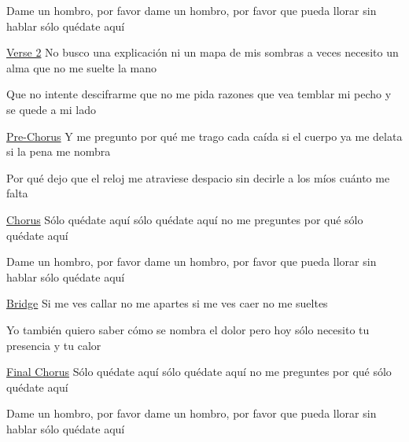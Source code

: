 Dame un hombro, por favor dame un hombro, por favor que pueda llorar sin
hablar sólo quédate aquí

\hyperref[verse-2]{Verse 2} No busco una explicación ni un mapa de mis
sombras a veces necesito un alma que no me suelte la mano

Que no intente descifrarme que no me pida razones que vea temblar mi
pecho y se quede a mi lado

\hyperref[pre-chorus]{Pre-Chorus} Y me pregunto por qué me trago cada
caída si el cuerpo ya me delata si la pena me nombra

Por qué dejo que el reloj me atraviese despacio sin decirle a los míos
cuánto me falta

\hyperref[chorus]{Chorus} Sólo quédate aquí sólo quédate aquí no me
preguntes por qué sólo quédate aquí

Dame un hombro, por favor dame un hombro, por favor que pueda llorar sin
hablar sólo quédate aquí

\hyperref[bridge]{Bridge} Si me ves callar no me apartes si me ves caer
no me sueltes

Yo también quiero saber cómo se nombra el dolor pero hoy sólo necesito
tu presencia y tu calor

\hyperref[final-chorus]{Final Chorus} Sólo quédate aquí sólo quédate
aquí no me preguntes por qué sólo quédate aquí

Dame un hombro, por favor dame un hombro, por favor que pueda llorar sin
hablar sólo quédate aquí
